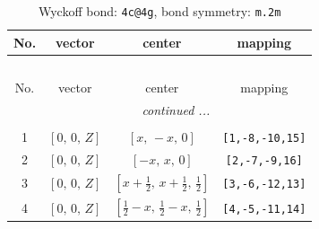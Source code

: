 \documentclass[fleqn,8pt]{jsarticle}
\begin{document}
\renewcommand{\arraystretch}{1.2}
\begin{longtable}{cccc}
\caption{Wyckoff bond: {\tt 4c@4g}, bond symmetry: {\tt m.2m}}
 \\
 \hline \hline
No. & vector & center & mapping \\ \hline \endfirsthead

\multicolumn{3}{l}{\tablename\ \thetable{}} \\
 \hline \hline
No. & vector & center & mapping \\ \hline \endhead

 \hline \hline
\multicolumn{3}{r}{\footnotesize\it continued ...} \\ \endfoot

 \hline \hline
\multicolumn{3}{r}{} \\ \endlastfoot

1 & $\left[ 0,\, 0,\, Z \right]$ & $\left[ x,\, - x,\, 0 \right]$ & {\tt [1,-8,-10,15]} \\ \hline
2 & $\left[ 0,\, 0,\, Z \right]$ & $\left[ - x,\, x,\, 0 \right]$ & {\tt [2,-7,-9,16]} \\ \hline
3 & $\left[ 0,\, 0,\, Z \right]$ & $\left[ x + \frac{1}{2},\, x + \frac{1}{2},\, \frac{1}{2} \right]$ & {\tt [3,-6,-12,13]} \\ \hline
4 & $\left[ 0,\, 0,\, Z \right]$ & $\left[ \frac{1}{2} - x,\, \frac{1}{2} - x,\, \frac{1}{2} \right]$ & {\tt [4,-5,-11,14]} \\
\end{longtable}
\renewcommand{\arraystretch}{1.2}
\end{document}
